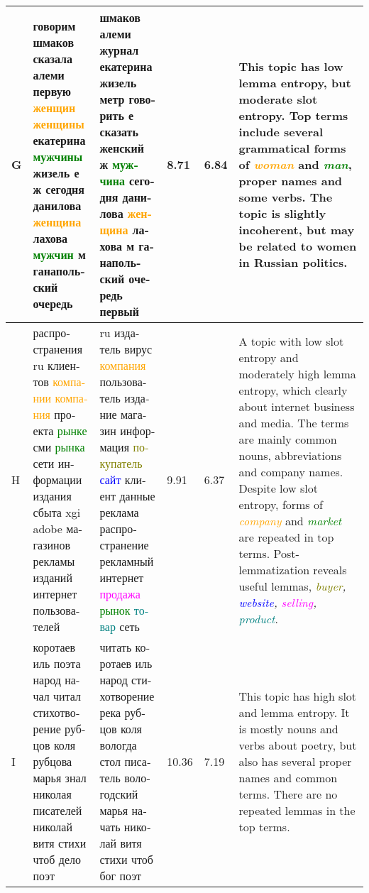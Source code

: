 \documentclass[11pt,a4paper]{article}
\begin{document}
\begin{landscape}
\begin{table*}[h!]
\begin{tabularx}{\textwidth}{|l|X|X|l|l|X|}
        G & \foreignlanguage{russian}{говорим шмаков сказала алеми первую \textcolor{orange}{женщин женщины} екатерина \textcolor{green}{мужчины} жизель е ж сегодня данилова \textcolor{orange}{женщина} лахова \textcolor{green}{мужчин} м ганапольский очередь} & \foreignlanguage{russian}{шмаков алеми журнал екатерина жизель метр говорить е сказать женский ж \textcolor{green}{мужчина} сегодня данилова \textcolor{orange}{женщина} лахова м ганапольский очередь первый} & 8.71 & 6.84 & This topic has low lemma entropy, but moderate slot entropy. Top terms include several grammatical forms of \textit{\textcolor{orange}{woman}} and \textit{\textcolor{green}{man}}, proper names and some verbs. The topic is slightly incoherent, but may be related to women in Russian politics. \\ \hline
        H & \foreignlanguage{russian}{распространения ru клиентов \textcolor{orange}{компании компания} проекта \textcolor{green}{рынке} сми \textcolor{green}{рынка} сети информации издания сбыта xgi adobe магазинов рекламы изданий интернет пользователей} & \foreignlanguage{russian}{ru издатель вирус \textcolor{orange}{компания} пользователь издание магазин информация \textcolor{olive}{покупатель} \textcolor{blue}{сайт} клиент данные реклама распространение рекламный интернет \textcolor{magenta}{продажа} \textcolor{green}{рынок} \textcolor{teal}{товар} сеть} & 9.91 & 6.37 & A topic with low slot entropy and moderately high lemma entropy, which clearly about internet business and media. The terms are mainly common nouns, abbreviations and company names. Despite low slot entropy, forms of \textit{\textcolor{orange}{company}} and \textit{\textcolor{green}{market}} are repeated in top terms. Post-lemmatization reveals useful lemmas, \textit{\textcolor{olive}{buyer}, \textcolor{blue}{website}, \textcolor{magenta}{selling}, \textcolor{teal}{product}}. \\ \hline
        I & \foreignlanguage{russian}{коротаев иль поэта народ начал читал стихотворение рубцов коля рубцова марья знал николая писателей николай витя стихи чтоб дело поэт} & \foreignlanguage{russian}{читать коротаев иль народ стихотворение река рубцов коля вологда стол писатель вологодский марья начать николай витя стихи чтоб бог поэт} & 10.36 & 7.19 & This topic has high slot and lemma entropy. It is mostly nouns and verbs about poetry, but also has several proper names and common terms. There are no repeated lemmas in the top terms. \\ \hline

\end{tabularx}
\end{table*}
\end{landscape}
\end{document}
